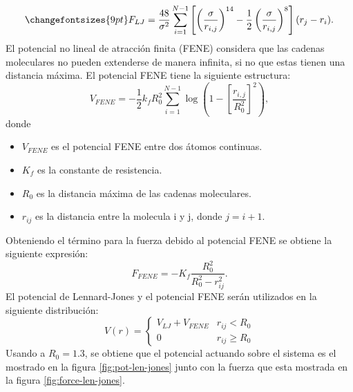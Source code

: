 \begin{equation}
    \changefontsizes{9pt}
    \label{eq:f-n}
    F_{LJ} = \frac{48}{\sigma^2}\sum\limits_{i=1}^{N-1}\left[\left(\frac{\sigma}{r_{i,j}}\right)^{14}-\frac{1}{2}\left(\frac{\sigma}{r_{i,j}} \right)^8  \right] (r_{j}-r_i).
\end{equation}
El potencial no lineal de atracción finita (FENE) considera que las cadenas moleculares no pueden extenderse de manera infinita, si no que estas tienen una distancia máxima. 
El potencial FENE tiene la siguiente estructura:
\begin{equation}
    V_{FENE}= -\frac{1}{2} k_f R_0^2 \sum\limits_{i=1}^{N-1} \log\left(1-\left[\frac{r_{i,j}}{R_0^2}\right]^2 \right),
    \label{eq:potFENE}
\end{equation}
donde
\begin{itemize}
    \item $V_{FENE}$ es el potencial FENE entre dos átomos continuas.
    \item $K_f$ es la constante de resistencia. 
    \item $R_0$ es la distancia máxima de las cadenas moleculares.
    \item $r_{ij}$ es la distancia entre la molecula i y j, donde $j=i+1$.
\end{itemize}
Obteniendo el término para la fuerza debido al potencial FENE se obtiene la siguiente expresión:
\begin{equation}
    \label{eq:forceFENE}
    F_{FENE}= -K_f \frac{R_0^2}{R_0^2-r_{ij}^2}.
\end{equation}
El potencial de Lennard-Jones y el potencial FENE serán utilizados en la siguiente distribución:
\begin{equation}
    V(r)= \left\lbrace\begin{matrix}
        V_{LJ}+V_{FENE} & r_{ij}<R_0\\
        0 & r_{ij} \geq R_0
    \end{matrix} \right.
\end{equation}
Usando a $R_0=1.3$, se obtiene que el potencial actuando sobre el sistema es el mostrado en la figura \ref{fig:pot-len-jones} junto con la fuerza que esta mostrada en la figura \ref{fig:force-len-jones}.
